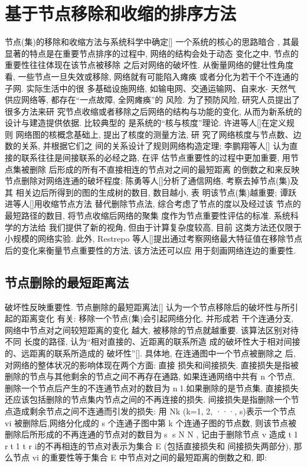 \section{基于节点移除和收缩的排序方法}
节点(集)的移除和收缩方法与系统科学中确定[] 一个系统的核心的思路暗合 , 其最显著的特点是在重要节点排序的过程中, 网络的结构会处于动态 变化之中, 节点的重要性往往体现在该节点被移除 之后对网络的破坏性. 从衡量网络的健壮性角度看, 一些节点一旦失效或移除, 网络就有可能陷入瘫痪 或者分化为若干个不连通的子网. 实际生活中的很 多基础设施网络, 如输电网、交通运输网、自来水- 天然气供应网络等, 都存在“一点故障, 全网瘫痪”的 风险. 为了预防风险, 研究人员提出了很多方法来研 究节点收缩或者移除之后网络的结构与功能的变化, 从而为新系统的设计与建造提供依据. 比较典型的 是系统的“核与核度”理论. 许进等人[]在定义规则 网络图的核概念基础上, 提出了核度的测量方法, 研 究了网络核度与节点数、边数的关系, 并根据它们之 间的关系设计了规则网络构造定理; 李鹏翔等人[] 认为直接的联系往往是间接联系的必经之路, 在评 估节点重要性的过程中更加重要, 用节点集被删除 后形成的所有不直接相连的节点对之间的最短距离 的倒数之和来反映节点删除对网络连通的破坏程度; 陈勇等人[]分析了通信网络, 考察去掉节点(集)及其 相关边后所得到的图的生成树的数目, 数目越小, 表 明该节点(集)越重要; 谭跃进等人[]用收缩节点方法 替代删除节点法, 综合考虑了节点的度以及经过该 节点的最短路径的数目, 将节点收缩后网络的聚集 度作为节点重要性评估的标准. 系统科学的方法给 我们提供了新的视角, 但由于计算复杂度较高, 目前 这类方法还仅限于小规模的网络实验. 此外, Restrepo 等人[]提出通过考察网络最大特征值在移除节点后的变化来衡量节点重要性的方法, 该方法还可以应 用于刻画网络连边的重要性.
\subsection{节点删除的最短距离法}
破坏性反映重要性. 节点删除的最短距离法[] 认为一个节点移除后的破坏性与所引起的距离变化 有关: 移除一个节点(集)会引起网络分化, 并形成若 干个连通分支, 网络中节点对之间较短距离的变化 越大, 被移除的节点就越重要. 该算法区别对待不同 长度的路径, 认为“相对直接的、近距离的联系所造 成的破坏性大于相对间接的、远距离的联系所造成的 破坏性”[]. 具体地, 在连通图中一个节点被删除之 后, 对网络的整体状况的影响体现在两个方面: 直接 损失和间接损失.
			直接损失是指被删除的节点与其他剩余的节点之间不再存在通路, 如果连通网络中共有 n 个节点,删除一个节点后产生的不连通节点对的数目为 n1.如果删除的是节点集, 直接损失还应该包括删除的节点集内节点之间的不再连接的损失. 间接损失是指删除一个节点造成剩余节点之间不连通而引发的损失: 用 Nk (k=1, 2, ···, s)表示一个节点 vi 被删除后,网络分化成的 s 个连通子图中第 k 个连通子图的节点数, 则该节点被删除后所形成的不再连通的节点对的数目为s s N N , 记由于删除节点 v 造成 t1 rt1 t r i的不再相连的节点对表示为集合 E (包括直接损失和 间接损失两部分), 那么节点 vi 的重要性等于集合 E 中节点对之间的最短距离的倒数之和, 即:

